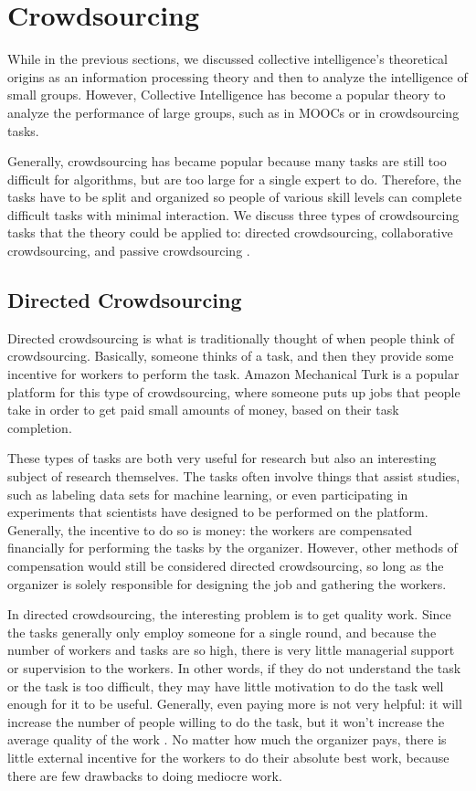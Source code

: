 \section{Crowdsourcing}
While in the previous sections, we discussed collective intelligence's theoretical origins as an information processing theory and then to analyze the intelligence of small groups. However, Collective Intelligence has become a popular theory to analyze the performance of large groups, such as in MOOCs or in crowdsourcing tasks. 

Generally, crowdsourcing has became popular because many tasks are still too difficult for algorithms, but are too large for a single expert to do. Therefore, the tasks have to be split and organized so people of various skill levels can complete difficult tasks with minimal interaction. We discuss three types of crowdsourcing tasks that the theory could be applied to: directed crowdsourcing, collaborative crowdsourcing, and passive crowdsourcing \cite{crowdsourcing}.

\subsection{Directed Crowdsourcing}
Directed crowdsourcing is what is traditionally thought of when people think of crowdsourcing. Basically, someone thinks of a task, and then they provide some incentive for workers to perform the task. Amazon Mechanical Turk is a popular platform for this type of crowdsourcing, where someone puts up jobs that people take in order to get paid small amounts of money, based on their task completion. 

These types of tasks are both very useful for research but also an interesting subject of research themselves. The tasks often involve things that assist studies, such as labeling data sets for machine learning, or even participating in experiments that scientists have designed to be performed on the platform. Generally, the incentive to do so is money: the workers are compensated financially for performing the tasks by the organizer. However, other methods of compensation would still be considered directed crowdsourcing, so long as the organizer is solely responsible for designing the job and gathering the workers.

In directed crowdsourcing, the interesting problem is to get quality work. Since the tasks generally only employ someone for a single round, and because the number of workers and tasks are so high, there is very little managerial support or supervision to the workers. In other words, if they do not understand the task or the task is too difficult, they may have little motivation to do the task well enough for it to be useful. Generally, even paying more is not very helpful: it will increase the number of people willing to do the task, but it won't increase the average quality of the work \cite{crowdsourcing}. No matter how much the organizer pays, there is little external incentive for the workers to do their absolute best work, because there are few drawbacks to doing mediocre work.

